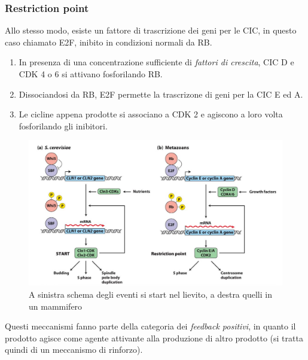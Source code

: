             \subsubsection{Restriction point}
                Allo stesso modo, esiste un fattore di trascrizione dei geni per le CIC, in questo caso chiamato E2F, inibito in condizioni normali da RB.
                \begin{enumerate}
                    \item In presenza di una concentrazione sufficiente di \textit{fattori di crescita}, CIC D e CDK 4 o 6 si attivano fosforilando RB.
                    \item Dissociandosi da RB, E2F permette la trascrizone di geni per la CIC E ed A. 
                    \item Le cicline appena prodotte si associano a CDK 2 e agiscono a loro volta fosforilando gli inibitori.
                \end{enumerate}
                \vspace{0.5cm}
                
            \begin{figure}[h]
                \centering
                \includegraphics[width=1\textwidth]{images/start_e_restrictionPoint.JPG}
                \caption{\small A sinistra schema degli eventi si start nel lievito, a destra quelli in un mammifero}
                \label{fig:mesh1}
            \end{figure}
            
            Questi meccanismi fanno parte della categoria dei \textit{feedback positivi}, in quanto il prodotto agisce come agente attivante alla produzione di altro prodotto (si tratta quindi di un meccanismo di rinforzo).\\
            
